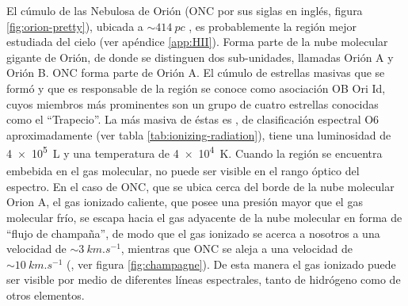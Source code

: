El cúmulo de las Nebulosa de Orión (ONC por sus siglas en inglés, figura \ref{fig:orion-pretty}), ubicada a $\sim \SI{414}{pc}$ \citep{Menten:2007}, es probablemente la región  mejor estudiada del cielo (ver apéndice \ref{app:HII}). Forma parte de la nube molecular gigante de Orión, de donde se distinguen dos sub-unidades, llamadas Orión A y Orión B. ONC forma parte de Orión A. El cúmulo de estrellas masivas que se formó y que es responsable de la región  se conoce como asociación OB Ori Id, cuyos miembros más prominentes son un grupo de cuatro estrellas conocidas como el ``Trapecio''. La más masiva de éstas es \thC{}, de clasificación espectral O6 aproximadamente (ver tabla \ref{tab:ionizing-radiation}), tiene una luminosidad de \SI{4e5}{L_\odot} y una temperatura de \SI{4e4}{K}. Cuando la región  se encuentra embebida en el gas molecular, no puede ser visible en el rango óptico del espectro. En el caso de ONC, que se ubica cerca del borde de la nube molecular Orion A, el gas ionizado caliente, que posee una presión mayor que el gas molecular frío, se escapa hacia el gas adyacente de la nube molecular en forma de ``flujo de champaña'', de modo que el gas ionizado se acerca a nosotros a una velocidad de $\sim \SI{3}{km.s^{-1}}$, mientras que ONC se aleja a una velocidad de $\sim \SI{10}{km.s^{-1}}$ (\citet{Stahler:2004}, ver figura \ref{fig:champagne}). De esta manera el gas ionizado puede ser visible por medio de diferentes líneas espectrales, tanto de hidrógeno como de otros elementos. 

